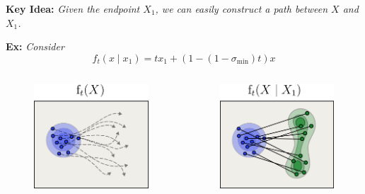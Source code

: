 \documentclass{beamer}
\begin{document}
\begin{frame}
    \begin{blackblock}
    \textbf{Key Idea:} \emph{Given the endpoint \( X_{1} \), we can easily construct a path between \( X \) and \( X_{1} \).}
    \end{blackblock}
    \textbf{Ex:} \emph{Consider} \[ f_t(x \mid x_{1}) = tx_{1} + (1 - (1 - \sigma_{\mathrm{min}})t)x \]
    \vskip 3pt
    \begin{columns}
        \begin{column}{0.49\linewidth}
        \begin{figure}
            \centering
            \includegraphics[width=\linewidth]{figures/marginal-path.png}
        \end{figure}
        \end{column}
        \begin{column}{0.49\linewidth}
        \begin{figure}
            \centering
            \includegraphics[width=\linewidth]{figures/conditional-path.png}

\end{figure}
\end{column}
\end{columns}
\end{frame}
\end{document}
